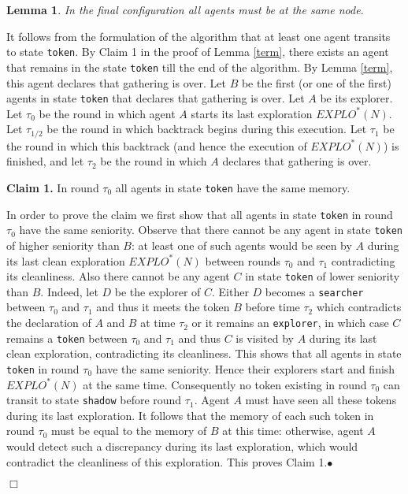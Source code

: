 \documentclass[11pt]{article}
\newtheorem{lemma}{Lemma}[section]
\newcommand{\finclaim}{\hfill $\bullet$}
\newcommand{\qed}{\hfill $\Box$ \bigbreak}
\newenvironment{proof}{\noindent {\bf Proof.}}{\qed}
\begin{document}
  \begin{lemma}\label{one}
   In the final configuration all agents must be at the same node.
   \end{lemma}

\begin{proof}
It follows from the formulation of the algorithm that at least one agent transits to state {\tt token}. By Claim 1 in the proof of Lemma \ref{term}, 
there exists an agent that remains in the state {\tt token} till the end of the algorithm. By Lemma \ref{term}, this agent declares that gathering is over.
Let $B$ be the first (or one of the first) agents in state {\tt token} that declares that gathering is over. Let $A$ be its explorer. Let $\tau_0$ be the round in which
agent $A$ starts its last exploration $EXPLO^*(N)$. Let $\tau_{1/2}$ be the round in which backtrack begins during this execution. Let $\tau_1$ be the round in which
this backtrack (and hence the execution of $EXPLO^*(N)$) is finished, and let $\tau_2$ be the round in which $A$ declares that gathering is over.

\vspace*{0.3cm}
\noindent
{\bf Claim 1.} In round $\tau_0$ all agents in state {\tt token} have the same memory.

In order to prove the claim we first show that all agents in state {\tt token} in round $\tau_0$ have the same seniority. Observe that there cannot be any agent
in state {\tt token} of higher seniority than $B$: {at least one of such agents} would be seen by $A$ during its last clean exploration $EXPLO^*(N)$ between rounds $\tau_0$
and $\tau_1$ contradicting its cleanliness. Also there cannot be any agent $C$ in state {\tt token} of lower seniority than $B$. Indeed, let $D$ be the explorer of $C$.
Either $D$ becomes a {\tt searcher} between $\tau_0$ and $\tau_1$ and thus it meets the token $B$ before time $ \tau_2$ which contradicts the
declaration of $A$ and $B$ at time $\tau_2$ or it remains an {\tt explorer}, in which case $C$ remains a {\tt token} between $\tau_0$ and $\tau_1$ and thus $C$ is visited
by $A$ during its last clean exploration,  contradicting its cleanliness. This shows that all agents in state {\tt token} in round $\tau_0$ have the same seniority.
Hence their explorers start and finish $EXPLO^*(N)$ at the same time. Consequently no token existing in round $\tau_0$ can transit to state {\tt shadow}
before round $\tau_1$. Agent $A$ must have seen all these tokens during its last exploration. It follows that the memory of each such token in round $\tau_0$ must
be equal to the memory of $B$ at this time: otherwise, agent $A$ would detect such a discrepancy during its last exploration, which would contradict the 
cleanliness of this exploration. This proves Claim 1.\finclaim


\end{proof}
\end{document}
